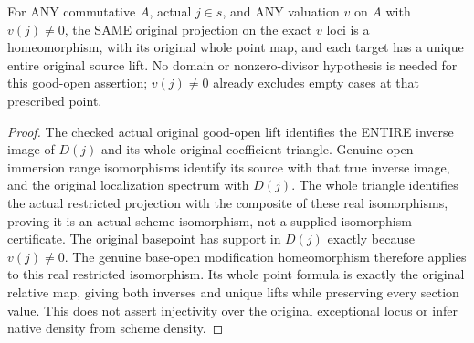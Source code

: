 \begin{theorem}
\label{scheme:paper-rees-native-good-open}
\leanok
{}
For ANY commutative $A$, actual $j\in s$, and ANY valuation $v$ on $A$
with $v(j)\ne0$, the SAME original projection on the exact $v$ loci is a
homeomorphism, with its original whole point map, and each target has a
unique entire original source lift. No domain or nonzero-divisor hypothesis
is needed for this good-open assertion; $v(j)\ne0$ already excludes empty
cases at that prescribed point.
\end{theorem}
\begin{proof}
The checked actual original good-open lift identifies the ENTIRE inverse
image of $D(j)$ and its whole original coefficient triangle. Genuine open
immersion range isomorphisms identify its source with that true inverse
image, and the original localization spectrum with $D(j)$. The whole
triangle identifies the actual restricted projection with the composite
of these real isomorphisms, proving it is an actual scheme isomorphism,
not a supplied isomorphism certificate. The original basepoint has support
in $D(j)$ exactly because $v(j)\ne0$. The genuine base-open modification
homeomorphism therefore applies to this real restricted isomorphism.
Its whole point formula is exactly the original relative map, giving
both inverses and unique lifts while preserving every section value.
This does not assert injectivity over the original exceptional locus or
infer native density from scheme density.
\end{proof}
